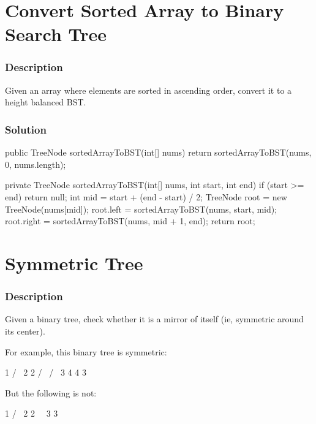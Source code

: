 \newpage

\section{Convert Sorted Array to Binary Search Tree} %

\subsubsection{Description}

Given an array where elements are sorted in ascending order, convert it to a height balanced BST.

\subsubsection{Solution}

\begin{Code}
public TreeNode sortedArrayToBST(int[] nums) {
    return sortedArrayToBST(nums, 0, nums.length);
}

private TreeNode sortedArrayToBST(int[] nums, int start, int end) {
    if (start >= end) {
        return null;
    }
    int mid = start + (end - start) / 2;
    TreeNode root = new TreeNode(nums[mid]);
    root.left = sortedArrayToBST(nums, start, mid);
    root.right = sortedArrayToBST(nums, mid + 1, end);
    return root;
}
\end{Code}

\newpage

\section{Symmetric Tree} %

\subsubsection{Description}

Given a binary tree, check whether it is a mirror of itself (ie, symmetric around its center).

For example, this binary tree \code{[1,2,2,3,4,4,3]} is symmetric:
\begin{Code}
    1
   / \
  2   2
 / \ / \
3  4 4  3
\end{Code}

But the following  is not:
\begin{Code}
    1
   / \
  2   2
   \   \
   3    3
\end{Code}

